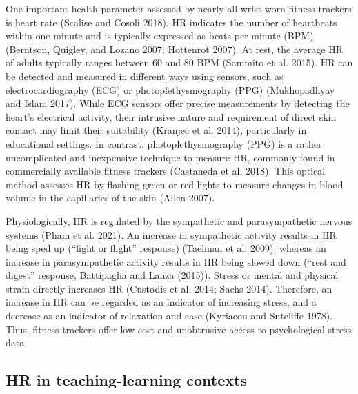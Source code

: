\documentclass[preprint,
3p]{elsarticle} %
\begin{document}
One important health parameter assessed by nearly all wrist-worn fitness
trackers is heart rate (Scalise and Cosoli 2018). HR indicates the
number of heartbeats within one minute and is typically expressed as
beats per minute (BPM) (Berntson, Quigley, and Lozano 2007; Hottenrot
2007). At rest, the average HR of adults typically ranges between 60 and
80 BPM (Sammito et al. 2015). HR can be detected and measured in
different ways using sensors, such as electrocardiography (ECG) or
photoplethysmography (PPG) (Mukhopadhyay and Islam 2017). While ECG
sensors offer precise measurements by detecting the heart's electrical
activity, their intrusive nature and requirement of direct skin contact
may limit their suitability (Kranjec et al. 2014), particularly in
educational settings. In contrast, photoplethysmography (PPG) is a
rather uncomplicated and inexpensive technique to measure HR, commonly
found in commercially available fitness trackers (Castaneda et al.
2018). This optical method assesses HR by flashing green or red lights
to measure changes in blood volume in the capillaries of the skin (Allen
2007).

Physiologically, HR is regulated by the sympathetic and parasympathetic
nervous systems (Pham et al. 2021). An increase in sympathetic activity
results in HR being sped up (``fight or flight'' response) (Taelman et
al. 2009); whereas an increase in parasympathetic activity results in HR
being slowed down (``rest and digest'' response, Battipaglia and Lanza
(2015)). Stress or mental and physical strain directly increases HR
(Custodis et al. 2014; Sachs 2014). Therefore, an increase in HR can be
regarded as an indicator of increasing stress, and a decrease as an
indicator of relaxation and ease (Kyriacou and Sutcliffe 1978). Thus,
fitness trackers offer low-cost and unobtrusive access to psychological
stress data.

\subsection{HR in teaching-learning
contexts}\label{hr-in-teaching-learning-contexts}
\end{document}
